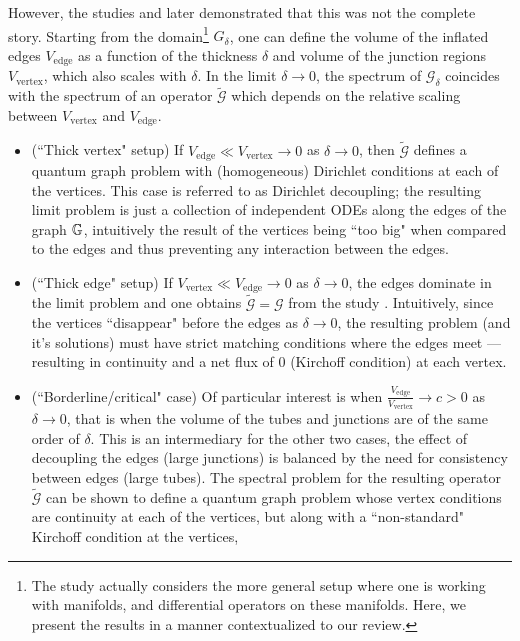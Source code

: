 However, the studies \cite{kuchment2003asymptotics} and \cite{exner2005convergence} later demonstrated that this was not the complete story.
Starting from the domain\footnote{The study \cite{exner2005convergence} actually considers the more general setup where one is working with manifolds, and differential operators on these manifolds. Here, we present the results in a manner contextualized to our review.} $G_{\delta}$, one can define the volume of the inflated edges $V_{\mathrm{edge}}$ as a function of the thickness $\delta$ and volume of the junction regions $V_{\mathrm{vertex}}$, which also scales with $\delta$.
In the limit $\delta\rightarrow0$, the spectrum of $\mathcal{G}_{\delta}$ coincides with the spectrum of an operator $\tilde{\mathcal{G}}$ which depends on the relative scaling between $V_{\mathrm{vertex}}$ and $V_{\mathrm{edge}}$.
\begin{itemize}
	\item (``Thick vertex" setup) If $V_{\mathrm{edge}}\ll V_{\mathrm{vertex}}\rightarrow0$ as $\delta\rightarrow0$, then $\tilde{\mathcal{G}}$ defines a quantum graph problem with (homogeneous) Dirichlet conditions at each of the vertices.
	This case is referred to as Dirichlet decoupling; the resulting limit problem is just a collection of independent ODEs along the edges of the graph $\mathbb{G}$, intuitively the result of the vertices being ``too big" when compared to the edges and thus preventing any interaction between the edges.
	\item (``Thick edge" setup) If $V_{\mathrm{vertex}}\ll V_{\mathrm{edge}}\rightarrow0$ as $\delta\rightarrow0$, the edges dominate in the limit problem and one obtains $\tilde{\mathcal{G}} = \mathcal{G}$ from the study \cite{kuchment2001convergence}.
	Intuitively, since the vertices ``disappear" before the edges as $\delta\rightarrow0$, the resulting problem (and it's solutions) must have strict matching conditions where the edges meet --- resulting in continuity and a net flux of 0 (Kirchoff condition) at each vertex.
	\item (``Borderline/critical" case) Of particular interest is when $\frac{V_{\mathrm{edge}}}{V_{\mathrm{vertex}}}\rightarrow c>0$ as $\delta\rightarrow0$, that is when the volume of the tubes and junctions are of the same order of $\delta$.
	This is an intermediary for the other two cases, the effect of decoupling the edges (large junctions) is balanced by the need for consistency between edges (large tubes).
	The spectral problem for the resulting operator $\tilde{\mathcal{G}}$ can be shown to define a quantum graph problem whose vertex conditions are continuity at each of the vertices, but along with a ``non-standard" Kirchoff condition at the vertices,

\end{itemize}
